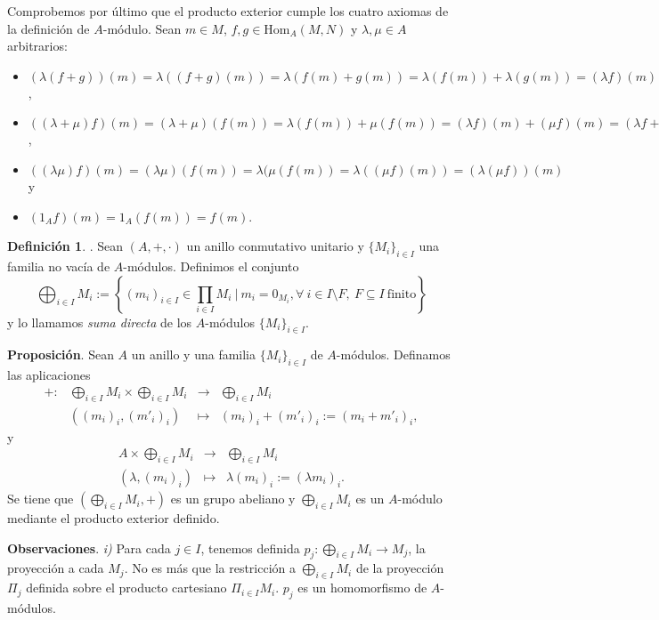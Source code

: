 \documentclass[a4paper,12pt]{article}
\newcommand{\Hom}{\text{Hom}}
\theoremstyle{definition}
\newtheorem{definition}[theorem]{Definición}
\begin{document}
Comprobemos por último que el producto exterior cumple los cuatro axiomas de la definición de $A$-módulo. Sean $m\in M$, $f,g\in\Hom_A(M,N)$ y $\lambda,\mu\in A$ arbitrarios:
\begin{itemize}
    \item[\textit{i})] $(\lambda(f+g))(m)=\lambda((f+g)(m))=\lambda(f(m)+g(m))=\lambda(f(m))+\lambda(g(m))=(\lambda f)(m)+(\lambda g)(m)=(\lambda f+\lambda g)(m)$,
    \item[\textit{ii})] $((\lambda+\mu)f)(m)=(\lambda+\mu)(f(m))=\lambda(f(m))+\mu(f(m))=(\lambda f)(m)+(\mu f)(m)=(\lambda f+\mu f)(m)$,
    \item[\textit{iii})] $((\lambda\mu)f)(m)=(\lambda\mu)(f(m))=\lambda(\mu(f(m))=\lambda((\mu f)(m))=(\lambda(\mu f))(m)$ y
    \item[\textit{iv})] $(1_A f)(m)=1_A(f(m))=f(m)$.
\end{itemize}

\begin{definition}. Sean $(A,+,\cdot)$ un anillo conmutativo unitario y $\{M_i\}_{i\in I}$ una familia no vacía de $A$-módulos. Definimos el conjunto
$$
\bigoplus_{i\in I}M_i:=\left\{{(m_i)}_{i\in I}\in\prod_{i\in I}M_i\ |\ m_i=0_{M_i},\forall\ i\in I\setminus F,\ F\subseteq I\ \text{finito}\right\}
$$
y lo llamamos \textit{suma directa} de los $A$-módulos $\{M_i\}_{i\in I}$.
\end{definition}

\textbf{Proposición}. Sean $A$ un anillo y una familia $\{M_i\}_{i\in I}$ de $A$-módulos. Definamos las aplicaciones
$$\begin{array}{rrcl}
    +:&\bigoplus_{i\in I}M_i\times\bigoplus_{i\in I}M_i&\longrightarrow&\bigoplus_{i\in I}M_i\\
    &({(m_i)}_i,{(m'_i)}_i)&\longmapsto&{(m_i)}_i+{(m'_i)}_i:={(m_i+m'_i)}_i,
\end{array}$$
y
$$\begin{array}{rcl}
    A\times\bigoplus_{i\in I}M_i&\longrightarrow&\bigoplus_{i\in I}M_i\\
    (\lambda,{(m_i)}_i)&\longmapsto&\lambda{(m_i)}_i:={(\lambda m_i)}_i.
\end{array}$$
Se tiene que $(\bigoplus_{i\in I}M_i,+)$ es un grupo abeliano y $\bigoplus_{i\in I}M_i$ es un $A$-módulo mediante el producto exterior definido.

\textbf{Observaciones}. \textit{\textit{i})} Para cada $j\in I$, tenemos definida $p_j:\bigoplus_{i\in I}M_i\rightarrow M_j$, la proyección a cada $M_j$. No es más que la restricción a $\bigoplus_{i\in I}M_i$ de la proyección $\Pi_j$ definida sobre el producto cartesiano $\Pi_{i\in I}M_i$. $p_j$ es un homomorfismo de $A$-módulos.
\end{document}
